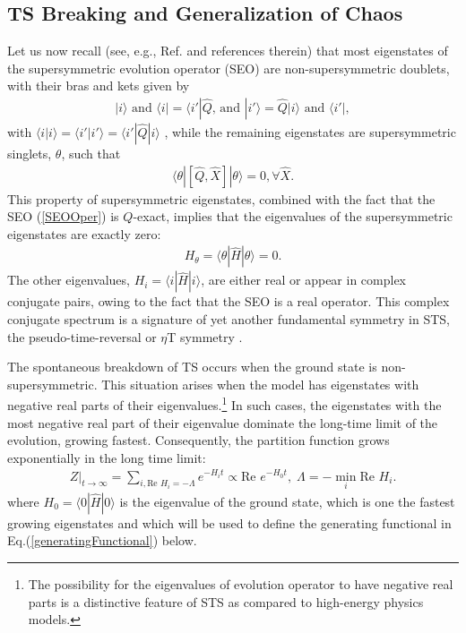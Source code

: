 \documentclass[final,5p,10pt,times,twocolumn,year]{elsarticle}
\begin{document}
\subsection{TS Breaking and Generalization of Chaos}
\label{Sec_SUSY_Breaking}
Let us now recall (see, e.g., Ref. \cite{Torsten,OvcEntropy} and references therein) that most eigenstates of the supersymmetric evolution operator (SEO) are non-supersymmetric doublets, with their bras and kets given by
\begin{eqnarray}
    | i \rangle   \text{ and } \langle i | = \langle i' |\hat Q  \text{, and }   |i'\rangle = \hat Q | i \rangle \text{ and } \langle i' |,\label{NonSUSY_states}
\end{eqnarray}
with $\langle i| i\rangle=\langle i'| i'\rangle=\langle i'| \hat Q|   i\rangle $ , while the remaining eigenstates are supersymmetric singlets, $\theta$, such that
\begin{eqnarray}
    \langle \theta | [\hat Q, \hat X] | \theta \rangle = 0, \forall \hat X.\label{SUSY_requirement}
\end{eqnarray}
This property of supersymmetric eigenstates, combined with the fact that the SEO (\ref{SEOOper}) is $Q$-exact, implies that the eigenvalues of the supersymmetric eigenstates are exactly zero:
\begin{eqnarray}
    {   H}_\theta = \langle \theta | \hat H | \theta \rangle = 0.\label{ZeroEigenvalues}
\end{eqnarray}
The other eigenvalues, ${   H}_i = \langle i| \hat H|i\rangle$, are either real or appear in complex conjugate pairs, owing to the fact that the SEO is a real operator. This complex conjugate spectrum is a signature of yet another fundamental symmetry in STS, the pseudo-time-reversal or $\eta$T symmetry \cite{Mos021,Mos023}. 

The spontaneous breakdown of TS occurs when the ground state is non-supersymmetric. This situation arises when the model has eigenstates with negative real parts of their eigenvalues.\footnote{The possibility for the eigenvalues of evolution operator to have negative real parts is a distinctive feature of STS as compared to high-energy physics models.} In such cases, the eigenstates with the most negative real part of their eigenvalue dominate the long-time limit of the evolution, growing fastest. Consequently, the partition function grows exponentially in the long time limit:
\begin{eqnarray}
    Z|_{t\to\infty} = \sum_{i, \text{Re } {   H}_i = - \Lambda} e^{-{   H}_i t}\propto \text{Re } e^{-{   H}_0 t},\; \Lambda = -\min_i \text{Re }{   H}_i.\label{ExponentialGrowth}
\end{eqnarray}
where ${   H}_0= \langle 0| \hat H | 0\rangle$ is the eigenvalue of the ground state, which is one the fastest growing eigenstates and which will be used to define the generating functional in Eq.(\ref{generatingFunctional}) below.
\end{document}

